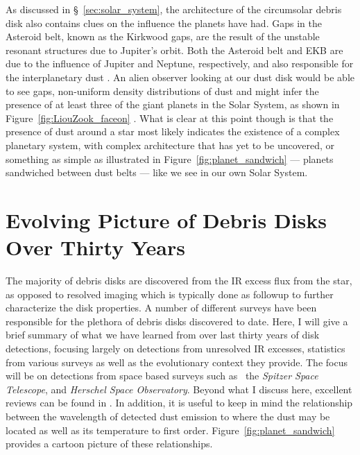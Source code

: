     As discussed in \S~\ref{sec:solar_system}, the architecture of the circumsolar debris disk also contains clues on the influence the planets have had. Gaps in the Asteroid belt, known as the Kirkwood gaps, are the result of the unstable resonant structures due to Jupiter's orbit. Both the Asteroid belt and EKB are due to the influence of Jupiter and Neptune, respectively, and also responsible for the interplanetary dust \citep[e.g.,][]{Morbidelli2010}. An alien observer looking at our dust disk would be able to see gaps, non-uniform density distributions of dust and might infer the presence of at least three of the giant planets in the Solar System, as shown in Figure~\ref{fig:LiouZook_faceon} \citep{Liou1999}. What is clear at this point though is that the presence of dust around a star most likely indicates the existence of a complex planetary system, with complex architecture that has yet to be uncovered, or something as simple as illustrated in Figure~\ref{fig:planet_sandwich} --- planets sandwiched between dust belts --- like we see in our own Solar System.  
    
    
\section{Evolving Picture of Debris Disks Over Thirty Years}\label{sec:thirty_years}
       
    The majority of debris disks are discovered from the IR excess flux from the star, as opposed to resolved imaging which is typically done as followup to further characterize the disk properties. A number of different surveys have been responsible for the plethora of debris disks discovered to date. Here, I will give a brief summary of what we have learned from over last thirty years of disk detections, focusing largely on detections from unresolved IR excesses, statistics from various surveys as well as the evolutionary context they provide. The focus will be on detections from space based surveys such as \iras\, the \textit{Spitzer Space Telescope}, and \textit{Herschel Space Observatory}. Beyond what I discuss here, excellent reviews can be found in \citet{Zuckerman2001, Wyatt2008, Matthews2014}.  In addition, it is useful to keep in mind the relationship between the wavelength of detected dust emission to where the dust may be located as well as its temperature to first order. Figure~\ref{fig:planet_sandwich} provides a cartoon picture of these relationships. 
   
